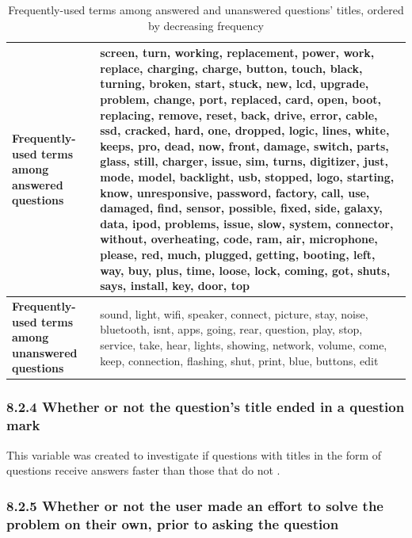 \documentclass{article}
\begin{document}
\begin{table}[!htbp]
\centering
\begin{tabular}{|L{4cm}|p{8cm}|}
  \hline
 \textbf{Frequently-used terms among answered questions} & screen, turn, working, replacement, power, work, replace, charging, charge, button, touch, black, turning, broken, start, stuck, new, lcd, upgrade, problem, change, port, replaced, card, open, boot, replacing, remove, reset, back, drive, error, cable, ssd, cracked, hard, one, dropped, logic, lines, white, keeps, pro, dead, now, front, damage, switch, parts, glass, still, charger, issue, sim, turns, digitizer, just, mode, model, backlight, usb, stopped, logo, starting, know, unresponsive, password, factory, call, use, damaged, find, sensor, possible, fixed, side, galaxy, data, ipod, problems, issue, slow, system, connector, without, overheating, code, ram, air, microphone, please, red, much, plugged, getting, booting, left, way, buy, plus, time, loose, lock, coming, got, shuts, says, install, key, door, top \\
  \hline
  \textbf{Frequently-used terms among unanswered questions} & sound, light, wifi, speaker, connect, picture, stay, noise, bluetooth, isnt, apps, going, rear, question, play, stop, service, take, hear, lights, showing, network, volume, come, keep, connection, flashing, shut, print, blue, buttons, edit \\ 
   \hline
\end{tabular}
\caption{Frequently-used terms among answered and unanswered questions' titles, ordered by decreasing frequency}
\label{table:frequent_terms}
\end{table}


\subsubsection*{8.2.4 Whether or not the question's title ended in a question mark}

This variable was created to investigate if questions with titles in the form of questions receive answers faster than those that do not \cite{Bhat2014}. 


\subsubsection*{8.2.5 Whether or not the user made an effort to solve the problem on their own, prior to asking the question}
\end{document}
